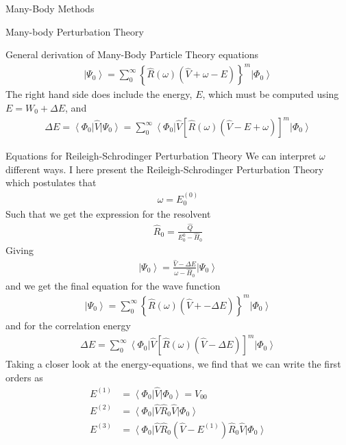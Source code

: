 \documentclass[twoside,english]{uiofysmaster}
\begin{document}
\begin{chapter}{Many-Body Methods}
\begin{section}{Many-body Perturbation Theory}
\begin{subsection}{General derivation of Many-Body Particle Theory equations}
	 		\begin{align}
	 			\left| \Psi_0 \right> = \sum_0^\infty \left\{ \hat R(\omega) (\hat V + \omega - E) \right\}^m \left| \Phi_0 \right>
	 		\end{align}
	 		The right hand side does include the energy, $E$, which must be computed using $ E = W_0 + \Delta E$, and
	 		\begin{align}
	 			\Delta E = \left< \Phi_0 \right| \hat V \left| \Psi_0 \right> 
	 			= \sum_0^\infty \left< \Phi_0 \right| \hat V \left[ \hat R(\omega) (\hat V - E + \omega) \right]^m \left| \Phi_0 \right>  
	 		\end{align}
	 	\end{subsection}

	 	\begin{subsection}{Equations for Reileigh-Schrodinger Perturbation Theory}
	 		We can interpret $\omega$ different ways. I here present the Reileigh-Schrodinger Perturbation Theory which postulates that
	 		\begin{align}
	 			\omega = E_0^{(0)}
	 		\end{align}
	 		Such that we get the expression for the resolvent
	 		\begin{align}
	 			\hat R_0 = \frac{\hat Q}{E_0^{0} - \hat H_0}
	 		\end{align}
	 		Giving
	 		\begin{align}
	 			\left| \Psi_0 \right> = \frac{ \hat V - \Delta E }{\omega - \hat H_0} \left| \Psi_0 \right>
	 		\end{align}
	 		and we get the final equation for the wave function 
	 		\begin{align}
	 			\left| \Psi_0 \right> = \sum_0^\infty \left\{ \hat R(\omega) (\hat V + - \Delta E) \right\}^m \left| \Phi_0 \right>
	 		\end{align}
	 		and for the correlation energy
	 		\begin{align}
	 			\Delta E = \sum_0^\infty \left< \Phi_0 \right| \hat V \left[ \hat R(\omega) (\hat V - \Delta E) \right]^m \left| \Phi_0 \right>  
	 		\end{align}
	 		Taking a closer look at the energy-equations, we find that we can write the first orders as
	 		\begin{align*}
	 			E^{(1)} &= \left< \Phi_0 \right| \hat V \left| \Phi_0 \right>  = V_{00}\\
	 			E^{(2)} &= \left< \Phi_0 \right| \hat V \hat R_0 \hat V \left| \Phi_0 \right> \\
	 			E^{(3)} &= \left< \Phi_0 \right| \hat V \hat R_0 (\hat V - E^{(1)})  \hat R_0 \hat V \left| \Phi_0 \right> \\

\end{align*}
\end{subsection}
\end{section}
\end{chapter}
\end{document}
